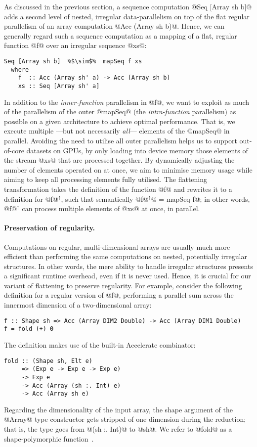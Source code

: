 As discussed in the previous section, a sequence computation @Seq [Array sh b]@ adds a second level of nested, irregular data-parallelism on top of the flat regular parallelism of an array computation @Acc (Array sh b)@. Hence, we can generally regard such a sequence computation as a mapping of a flat, regular function @f@ over an irregular sequence @xs@:
%
\begin{lstlisting}
Seq [Array sh b]  %$\sim$%  mapSeq f xs
  where
    f  :: Acc (Array sh' a) -> Acc (Array sh b)
    xs :: Seq [Array sh' a]
\end{lstlisting}
%
In addition to the \emph{inner-function} parallelism in @f@, we want to
exploit as much of the parallelism of the outer @mapSeq@ (the \emph{intra-function} parallelism) as possible on a
given architecture to achieve optimal performance. That is, we execute multiple ---but not necessarily \emph{all}--- elements of the @mapSeq@ in
parallel. Avoiding the need to utilise all outer parallelism helps us to support out-of-core datasets on GPUs, by only loading into
device memory those elements of the stream @xs@ that are processed together. By
dynamically adjusting the number of elements operated on at once, we aim to
minimise memory usage while aiming to keep all processing elements fully utilised. The flattening transformation takes the definition of the function @f@ and rewrites it to a definition for @f@$^\uparrow$, such that semantically @f@$^\uparrow$@ = mapSeq f@; in other words, @f@$^\uparrow$ can process multiple elements of @xs@ at once, in parallel.

\paragraph{Preservation of regularity.} Computations on regular, multi-dimensional arrays are usually much more efficient than performing the same computations on nested, potentially irregular structures. In other words, the mere ability to handle irregular structures presents a significant runtime overhead, even if it is never used. Hence, it is crucial for our variant of flattening to preserve regularity. For example, consider the following definition for a regular version of @f@, performing a parallel sum across the innermost dimension of a two-dimensional array:
%
\begin{lstlisting}
f :: Shape sh => Acc (Array DIM2 Double) -> Acc (Array DIM1 Double)
f = fold (+) 0
\end{lstlisting}
%
The definition makes use of the built-in Accelerate combinator:
%
\begin{lstlisting}
fold :: (Shape sh, Elt e)
     => (Exp e -> Exp e -> Exp e)
     -> Exp e
     -> Acc (Array (sh :. Int) e)
     -> Acc (Array sh e)
\end{lstlisting}
%
Regarding the dimensionality of the input array, the shape argument of the
@Array@ type constructor gets stripped of one dimension during the reduction;
that is, the type goes from @(sh :. Int)@ to @sh@. We refer to @fold@ as a
shape-polymorphic function~\citep{Keller:Repa}.

